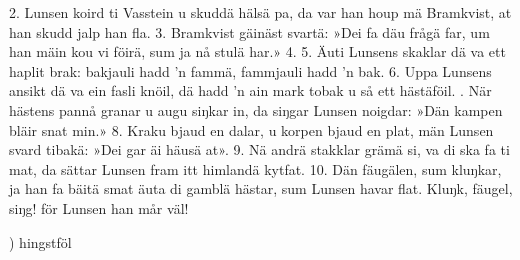 \setlength{\columnsep}{0.3cm}
\begin{multicols}{2}
2.  Lunsen koird ti Vasstein u skuddä hälsä pa,
    da var han houp mä Bramkvist,
    \qquad{}at han skudd jalp han fla.
3.  Bramkvist gäinäst svartä: »Dei fa däu frågä far,
    um han mäin kou vi föirä, sum ja nå stulä har.»
4.  
5.  Äuti Lunsens skaklar dä va ett haplit brak:
    bakjauli hadd ’n fammä, fammjauli hadd ’n bak.
6.  Uppa Lunsens ansikt dä va ein fasli knöil,
    dä hadd ’n ain mark tobak u så ett hästäföil.
\vfill{}.  När hästens pannå granar u augu siŋkar in,
    da siŋgar Lunsen noigdar:
    \qquad{}»Dän kampen bläir snat min.»
8.  Kraku bjaud en dalar, u korpen bjaud en plat,
    män Lunsen svard tibakä: »Dei gar äi häusä at».
9.  Nä andrä stakklar grämä si, va di ska fa ti mat,
    da sättar Lunsen fram itt himlandä kytfat.
10. Dän fäugälen, sum kluŋkar, ja han fa bäitä smat
    äuta di gamblä hästar, sum Lunsen havar flat.
    Kluŋk, fäugel, siŋg! för Lunsen han mår väl!
\end{multicols}
\vspace{5mm}
\tabto{0.2cm}) hingstföl
